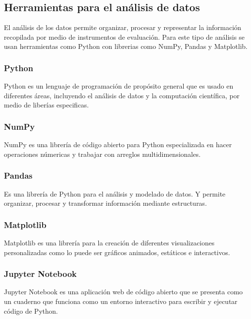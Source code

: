 \subsection{Herramientas para el análisis de datos}
El análisis de los datos permite organizar, procesar y representar la información recopilada por medio de instrumentos de evaluación. Para este tipo de análisis se usan herramientas como Python con librerias como NumPy, Pandas y Matplotlib.
\subsubsection{Python}
Python es un lenguaje de programación de propósito general que es usado en diferentes áreas, incluyendo el análisis de datos y la computación científica, por medio de liberías especificas. \cite{python}
\subsubsection{NumPy}
NumPy es una librería de código abierto para Python especializada en hacer operaciones númericas y trabajar con arreglos multidimensionales.  \cite{numpy}
\subsubsection{Pandas}
Es una librería de Python para el análisis y modelado de datos. Y permite organizar, procesar y transformar información mediante estructuras. \cite{pandas}
\subsubsection{Matplotlib}
Matplotlib es una librería para la creación de diferentes visualizaciones personalizadas como lo puede ser gráficos animados, estáticos e interactivos. \cite{matplotlib}
\subsubsection{Jupyter Notebook}
Jupyter Notebook es una aplicación web de código abierto que se presenta como un cuaderno que funciona como un entorno interactivo para escribir y ejecutar código de Python. \cite{jupyterNotebook}